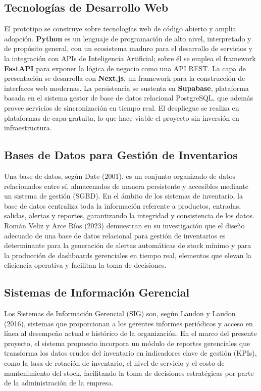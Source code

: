 \documentclass[12pt, letterpaper]{report}
\begin{document}
\subsection{Tecnologías de Desarrollo Web}

El prototipo se construye sobre tecnologías web de código abierto y
amplia adopción. \textbf{Python} es un lenguaje de programación de alto
nivel, interpretado y de propósito general, con un ecosistema maduro
para el desarrollo de servicios y la integración con APIs de
Inteligencia Artificial; sobre él se emplea el framework
\textbf{FastAPI} para exponer la lógica de negocio como una API REST.
La capa de presentación se desarrolla con \textbf{Next.js}, un
framework para la construcción de interfaces web modernas. La
persistencia se sustenta en \textbf{Supabase}, plataforma basada en el
sistema gestor de base de datos relacional PostgreSQL, que además
provee servicios de sincronización en tiempo real. El despliegue se
realiza en plataformas de capa gratuita, lo que hace viable el proyecto
sin inversión en infraestructura.

\subsection{Bases de Datos para Gestión de Inventarios}

Una base de datos, según Date (2001), es un conjunto organizado de
datos relacionados entre sí, almacenados de manera persistente y
accesibles mediante un sistema de gestión (SGBD). En el ámbito de los
sistemas de inventario, la base de datos centraliza toda la información
referente a productos, entradas, salidas, alertas y reportes,
garantizando la integridad y consistencia de los datos. Román Veliz y
Arce Ríos (2023) demuestran en su investigación que el diseño adecuado
de una base de datos relacional para gestión de inventarios es
determinante para la generación de alertas automáticas de stock mínimo
y para la producción de dashboards gerenciales en tiempo real, elementos
que elevan la eficiencia operativa y facilitan la toma de decisiones.

\subsection{Sistemas de Información Gerencial}

Los Sistemas de Información Gerencial (SIG) son, según Laudon y Laudon
(2016), sistemas que proporcionan a los gerentes informes periódicos y
acceso en línea al desempeño actual e histórico de la organización. En
el marco del presente proyecto, el sistema propuesto incorpora un módulo
de reportes gerenciales que transforma los datos crudos del inventario
en indicadores clave de gestión (KPIs), como la tasa de rotación de
inventario, el nivel de servicio y el costo de mantenimiento del stock,
facilitando la toma de decisiones estratégicas por parte de la
administración de la empresa.
\end{document}
